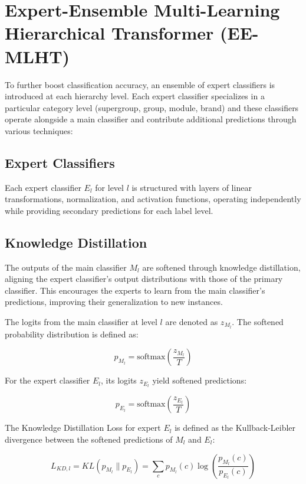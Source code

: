 \documentclass[9pt,a4paper,twoside]{rho-class/rho}
\begin{document}
\section{Expert-Ensemble Multi-Learning Hierarchical Transformer (EE-MLHT)}

To further boost classification accuracy, an ensemble of expert classifiers is introduced at each hierarchy level. Each expert classifier specializes in a particular category level (supergroup, group, module, brand) and these classifiers operate alongside a main classifier and contribute additional predictions through various techniques:

 \subsection{Expert Classifiers}
    
        Each expert classifier \( E_l \) for level \( l \) is structured with layers of linear transformations, normalization, and activation functions, operating independently while providing secondary predictions for each label level.

 \subsection{Knowledge Distillation}
    
        The outputs of the main classifier \( M_l \) are softened through knowledge distillation, aligning the expert classifier’s output distributions with those of the primary classifier. This encourages the experts to learn from the main classifier’s predictions, improving their generalization to new instances. 

   The logits from the main classifier at level \( l \) are denoted as \( z_{M_l} \). The softened probability distribution is defined as:

   \[
   p_{M_l} = \text{softmax}\left(\frac{z_{M_l}}{T}\right)
   \]

   For the expert classifier \( E_l \), its logits \( z_{E_l} \) yield softened predictions:

   \[
   p_{E_l} = \text{softmax}\left(\frac{z_{E_l}}{T}\right)
   \]

   The Knowledge Distillation Loss for expert \( E_l \) is defined as the Kullback-Leibler divergence between the softened predictions of \( M_l \) and \( E_l \):

   \[
   L_{KD,l} = KL\left(p_{M_l} \| p_{E_l}\right) = \sum_{c} p_{M_l}(c) \log\left(\frac{p_{M_l}(c)}{p_{E_l}(c)}\right)
   \]
\end{document}
